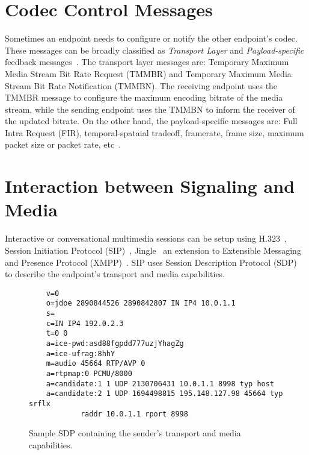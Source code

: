 

\section{Codec Control Messages}

Sometimes an endpoint needs to configure or notify the other endpoint's codec.
These messages can be broadly classified as \emph{Transport Layer} and  \emph
{Payload-specific} feedback messages~\cite{rfc5104}. The transport layer
messages are: Temporary Maximum Media Stream Bit Rate Request (TMMBR) and
Temporary Maximum Media Stream Bit Rate Notification (TMMBN). The receiving
endpoint uses the TMMBR message to configure the maximum encoding bitrate of
the media stream, while the sending endpoint uses the TMMBN to inform the
receiver of the updated bitrate. On the other hand, the payload-specific
messages are: Full Intra Request (FIR), temporal-spataial tradeoff, framerate,
frame size, maximum packet size or packet rate, etc~\cite{draft.avt.cop}.



\section{Interaction between Signaling and Media}


Interactive or conversational multimedia sessions can be setup using
H.323~\cite{H.323}, Session Initiation Protocol (SIP)~\cite{rfc3261},
Jingle~\cite{XEP-0166} an extension to Extensible Messaging and Presence
Protocol (XMPP)~\cite{rfc6120}. SIP uses Session Description Protocol
(SDP)~\cite{rfc4566} to describe the endpoint's transport and media
capabilities. 

\begin{figure}[!h]
{\footnotesize
\begin{verbatim}
    v=0
    o=jdoe 2890844526 2890842807 IN IP4 10.0.1.1
    s=
    c=IN IP4 192.0.2.3
    t=0 0
    a=ice-pwd:asd88fgpdd777uzjYhagZg
    a=ice-ufrag:8hhY
    m=audio 45664 RTP/AVP 0
    a=rtpmap:0 PCMU/8000
    a=candidate:1 1 UDP 2130706431 10.0.1.1 8998 typ host
    a=candidate:2 1 UDP 1694498815 195.148.127.98 45664 typ srflx 
            raddr 10.0.1.1 rport 8998
\end{verbatim}}
\caption{Sample SDP containing the sender's transport and media capabilities.}
\end{figure}


